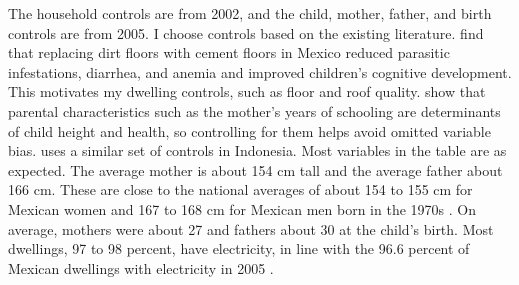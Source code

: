 The household controls are from 2002, and the child, mother, father, and birth controls are from 2005. I choose controls based on the existing literature. \textcite{cattaneoHousingHealthHappiness2009} find that replacing dirt floors with cement floors in Mexico reduced parasitic infestations, diarrhea, and anemia and improved children's cognitive development. This motivates my dwelling controls, such as floor and roof quality. \textcite{thomasHowDoesMothers1991} show that parental characteristics such as the mother's years of schooling are determinants of child height and health, so controlling for them helps avoid omitted variable bias. \textcite{thamarapaniNaturalDisastersChild2021} uses a similar set of controls in Indonesia. Most variables in the table are as expected. The average mother is about 154 cm tall and the average father about 166 cm. These are close to the national averages of about 154 to 155 cm for Mexican women and 167 to 168 cm for Mexican men born in the 1970s \parencite{ncdriskfactorcollaborationCenturyTrendsAdult2016}. On average, mothers were about 27 and fathers about 30 at the child's birth. Most dwellings, 97 to 98 percent, have electricity, in line with the 96.6 percent of Mexican dwellings with electricity in 2005 \parencite{inegiIIConteoPoblacion2005}.

\clearpage









